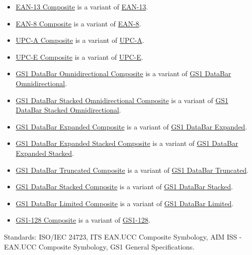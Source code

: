 \begin{itemize}
\tightlist
\item
  \protect\hyperlink{ean-13-composite}{EAN-13 Composite} is a variant of
  \protect\hyperlink{ean-13}{EAN-13}.
\item
  \protect\hyperlink{ean-8-composite}{EAN-8 Composite} is a variant of
  \protect\hyperlink{ean-8}{EAN-8}.
\item
  \protect\hyperlink{upc-a-composite}{UPC-A Composite} is a variant of
  \protect\hyperlink{upc-a}{UPC-A}.
\item
  \protect\hyperlink{upc-e-composite}{UPC-E Composite} is a variant of
  \protect\hyperlink{upc-e}{UPC-E}.
\item
  \protect\hyperlink{gs1-databar-omnidirectional-composite}{GS1 DataBar
  Omnidirectional Composite} is a variant of
  \protect\hyperlink{gs1-databar-omnidirectional}{GS1 DataBar
  Omnidirectional}.
\item
  \protect\hyperlink{gs1-databar-stacked-omnidirectional-composite}{GS1
  DataBar Stacked Omnidirectional Composite} is a variant of
  \protect\hyperlink{gs1-databar-stacked-omnidirectional}{GS1 DataBar
  Stacked Omnidirectional}.
\item
  \protect\hyperlink{gs1-databar-expanded-composite}{GS1 DataBar
  Expanded Composite} is a variant of
  \protect\hyperlink{gs1-databar-expanded}{GS1 DataBar Expanded}.
\item
  \protect\hyperlink{gs1-databar-expanded-stacked-composite}{GS1 DataBar
  Expanded Stacked Composite} is a variant of
  \protect\hyperlink{gs1-databar-expanded-stacked}{GS1 DataBar Expanded
  Stacked}.
\item
  \protect\hyperlink{gs1-databar-truncated-composite}{GS1 DataBar
  Truncated Composite} is a variant of
  \protect\hyperlink{gs1-databar-truncated}{GS1 DataBar Truncated}.
\item
  \protect\hyperlink{gs1-databar-stacked-composite}{GS1 DataBar Stacked
  Composite} is a variant of \protect\hyperlink{gs1-databar-stacked}{GS1
  DataBar Stacked}.
\item
  \protect\hyperlink{gs1-databar-limited-composite}{GS1 DataBar Limited
  Composite} is a variant of \protect\hyperlink{gs1-databar-limited}{GS1
  DataBar Limited}.
\item
  \protect\hyperlink{gs1-128-composite}{GS1-128 Composite} is a variant
  of \protect\hyperlink{gs1-128}{GS1-128}.
\end{itemize}

Standards: ISO/IEC 24723, ITS EAN.UCC Composite Symbology, AIM ISS -
EAN.UCC Composite Symbology, GS1 General Specifications.

